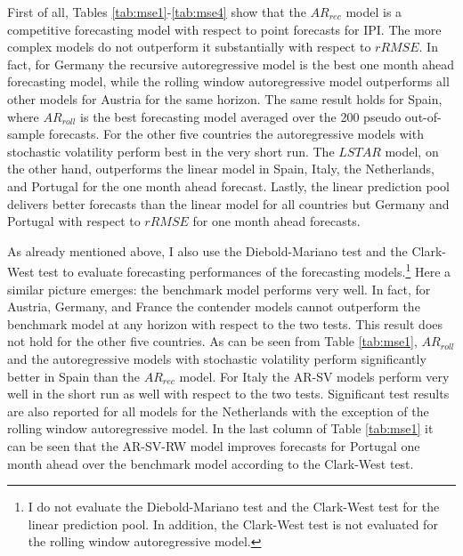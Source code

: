 \documentclass[12pt,letterpaper,fleqn]{article}           %
\begin{document}
First of all, Tables \ref{tab:mse1}-\ref{tab:mse4} show that the $AR_{rec}$ model is a competitive forecasting model with respect to point forecasts for IPI. The more complex models do not outperform it substantially with respect to $rRMSE$. In fact, for Germany the recursive autoregressive model is the best one month ahead forecasting model, while the rolling window autoregressive model outperforms all other models for Austria for the same horizon. The same result holds for Spain, where $AR_{roll}$ is the best forecasting model averaged over the 200 pseudo out-of-sample forecasts. For the other five countries the autoregressive models with stochastic volatility perform best in the very short run. The $LSTAR$ model, on the other hand, outperforms the linear model in Spain, Italy, the Netherlands, and Portugal for the one month ahead forecast. Lastly, the linear prediction pool delivers better forecasts than the linear model for all countries but Germany and Portugal with respect to $rRMSE$ for one month ahead forecasts. 

As already mentioned above, I also use the Diebold-Mariano test and the Clark-West test to evaluate forecasting performances of the forecasting models.\footnote{I do not evaluate the Diebold-Mariano test and the Clark-West test for the linear prediction pool. In addition, the Clark-West test is not evaluated for the rolling window autoregressive model.}  Here a similar picture emerges: the benchmark model performs very well. In fact, for Austria, Germany, and France the contender models cannot outperform the benchmark model at any horizon with respect to the two tests. This result does not hold for the other five countries. As can be seen from Table \ref{tab:mse1}, $AR_{roll}$ and the autoregressive models with stochastic volatility perform significantly better in Spain than the $AR_{rec}$ model. For Italy the AR-SV models perform very well in the short run as well with respect to the two tests. Significant test results are also reported for all models for the Netherlands with the exception of the rolling window autoregressive model. In the last column of Table \ref{tab:mse1} it can be seen that the AR-SV-RW model improves forecasts for Portugal one month ahead over the benchmark model according to the Clark-West test.
\end{document}

